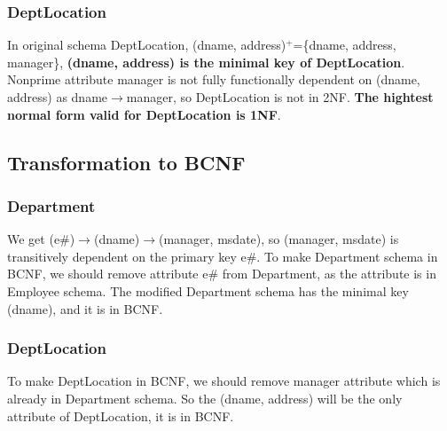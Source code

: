 \documentclass[12pt]{article}%
\begin{document}
\subsubsection*{DeptLocation}
\noindent In original schema DeptLocation, (dname, address)$^+$=\{dname, address, manager\}, \textbf{(dname, address) is the minimal key of DeptLocation}. Nonprime attribute manager is not fully functionally dependent on (dname, address) as dname$\rightarrow$manager, so DeptLocation is not in 2NF. \textbf{The hightest normal form valid for DeptLocation is 1NF}. 

\subsection*{Transformation to BCNF}
\subsubsection*{Department}
We get (e\#)$\rightarrow$(dname)$\rightarrow$(manager, msdate), so (manager, msdate) is transitively dependent on the primary key e\#. To make Department schema in BCNF, we should remove attribute e\# from Department, as the attribute is in Employee schema. The modified Department schema has the minimal key (dname), and it is in BCNF.

\subsubsection*{DeptLocation}
To make DeptLocation in BCNF, we should remove manager attribute which is already in Department schema. So the (dname, address) will be the only attribute of DeptLocation, it is in BCNF. 
\clearpage
\end{document}
